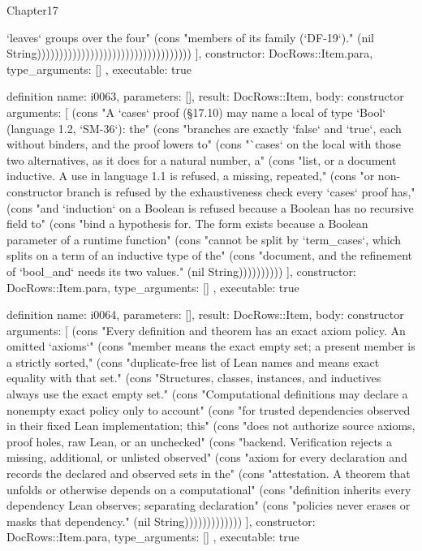 \begin{lexlean}{Chapter17}
\begin{semanticmodule}
{{`leaves` groups over the four" (cons "members of its family (`DF-19`)." (nil String)))))))))))))))))))))))))))))))))))
    ],
    constructor: DocRows::Item.para,
    type_arguments: []
  },
  executable: true
}

definition{
  name: i0063,
  parameters: [],
  result: DocRows::Item,
  body: constructor{
    arguments: [
      (cons "A `cases` proof (§17.10) may name a local of type `Bool` (language 1.2, `SM-36`): the" (cons "branches are exactly `false` and `true`, each without binders, and the proof lowers to" (cons "`cases` on the local with those two alternatives, as it does for a natural number, a" (cons "list, or a document inductive. A use in language 1.1 is refused, a missing, repeated," (cons "or non-constructor branch is refused by the exhaustiveness check every `cases` proof has," (cons "and `induction` on a Boolean is refused because a Boolean has no recursive field to" (cons "bind a hypothesis for. The form exists because a Boolean parameter of a runtime function" (cons "cannot be split by `term_cases`, which splits on a term of an inductive type of the" (cons "document, and the refinement of `bool_and` needs its two values." (nil String))))))))))
    ],
    constructor: DocRows::Item.para,
    type_arguments: []
  },
  executable: true
}

definition{
  name: i0064,
  parameters: [],
  result: DocRows::Item,
  body: constructor{
    arguments: [
      (cons "Every definition and theorem has an exact axiom policy. An omitted `axioms`" (cons "member means the exact empty set; a present member is a strictly sorted," (cons "duplicate-free list of Lean names and means exact equality with that set." (cons "Structures, classes, instances, and inductives always use the exact empty set." (cons "Computational definitions may declare a nonempty exact policy only to account" (cons "for trusted dependencies observed in their fixed Lean implementation; this" (cons "does not authorize source axioms, proof holes, raw Lean, or an unchecked" (cons "backend. Verification rejects a missing, additional, or unlisted observed" (cons "axiom for every declaration and records the declared and observed sets in the" (cons "attestation. A theorem that unfolds or otherwise depends on a computational" (cons "definition inherits every dependency Lean observes; separating declaration" (cons "policies never erases or masks that dependency." (nil String)))))))))))))
    ],
    constructor: DocRows::Item.para,
    type_arguments: []
  },
  executable: true
}


\end{semanticmodule}
\end{lexlean}
